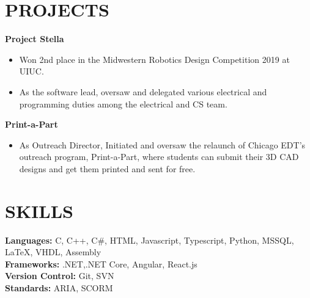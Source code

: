 \documentclass[11pt,letterpaper]{article}
\newcommand{\subheading}[3]{
    \textbf{#1}{ #2 }{\hfill #3 \vspace{-2pt}}
}
\begin{document}
\section{PROJECTS}
\subheading{Project Stella}{}{}
\vspace{-10pt}
\begin{itemize}
  \item Won 2nd place in the Midwestern Robotics Design Competition 2019 at UIUC.
  \item As the software lead,  oversaw and delegated various electrical and programming duties among the electrical and CS team.
\end{itemize}
\vspace{-10pt}
\subheading{Print-a-Part}{}{}
\vspace{-10pt}
\begin{itemize}
  \item  As Outreach Director, Initiated and oversaw the relaunch of Chicago EDT's outreach program, Print-a-Part, where students can submit their 3D CAD designs and get them printed and sent for free.
\end{itemize}
\vspace{-10pt}
\begin{comment}
\{}{}{NASA Robot Mining Competition}{-- Team Lunabotics} \\
\vspace{-10pt}
\begin{itemize}
  \item  Initiated and oversaw the conversion of Chicago EDT's  existing assets from Altium Designer to Autodesk EAGLE \\
\end{itemize}
\vspace{-10pt}
\end{comment}
%
\vspace{-10pt}
\section*{SKILLS}
\textbf{Languages:} C, C++, C\#, HTML, Javascript, Typescript, Python, MSSQL, LaTeX, VHDL, Assembly \\
\textbf{Frameworks:} .NET,.NET Core, Angular, React.js \\
\textbf{Version Control:} Git, SVN \\
\textbf{Standards:} ARIA, SCORM \\
\end{document}
